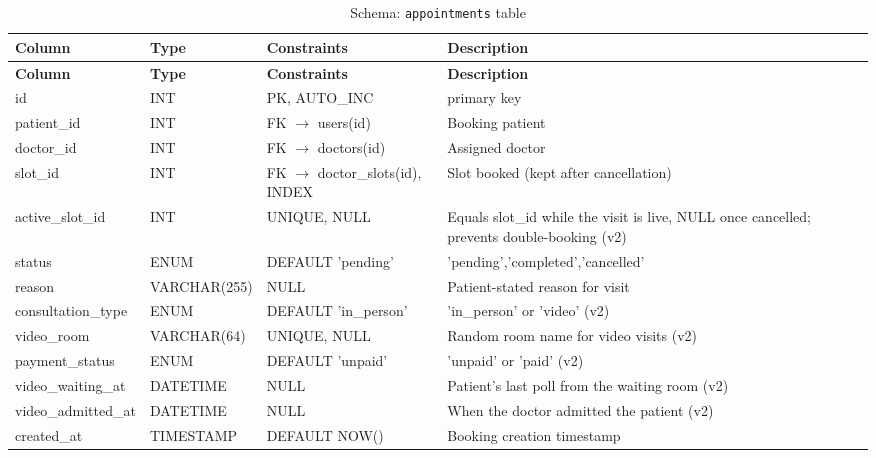 \begin{longtable}{|L{2.8cm}|L{2.6cm}|L{2.2cm}|L{5.2cm}|}
\caption{Schema: \texttt{appointments} table} \label{tab:appts} \\
\hline
\textbf{Column} & \textbf{Type} & \textbf{Constraints} & \textbf{Description} \\
\hline
\endfirsthead
\hline
\textbf{Column} & \textbf{Type} & \textbf{Constraints} & \textbf{Description} \\
\hline
\endhead
\hline
\endfoot
id          & INT           & PK, AUTO\_INC     &  primary key \\
\hline
patient\_id & INT           & FK $\rightarrow$ users(id)    & Booking patient \\
\hline
doctor\_id  & INT           & FK $\rightarrow$ doctors(id)  & Assigned doctor \\
\hline
slot\_id    & INT           & FK $\rightarrow$ doctor\_slots(id), INDEX & Slot booked (kept after cancellation) \\
\hline
active\_slot\_id & INT     & UNIQUE, NULL      & Equals slot\_id while the visit is live, NULL once cancelled; prevents double-booking (v2) \\
\hline
status      & ENUM          & DEFAULT 'pending' & 'pending','completed','cancelled' \\
\hline
reason      & VARCHAR(255)  & NULL              & Patient-stated reason for visit \\
\hline
consultation\_type & ENUM & DEFAULT 'in\_person' & 'in\_person' or 'video' (v2) \\
\hline
video\_room  & VARCHAR(64)   & UNIQUE, NULL      & Random room name for video visits (v2) \\
\hline
payment\_status & ENUM       & DEFAULT 'unpaid'  & 'unpaid' or 'paid' (v2) \\
\hline
video\_waiting\_at & DATETIME & NULL            & Patient's last poll from the waiting room (v2) \\
\hline
video\_admitted\_at & DATETIME & NULL           & When the doctor admitted the patient (v2) \\
\hline
created\_at & TIMESTAMP     & DEFAULT NOW()     & Booking creation timestamp \\
\hline
\end{longtable}

